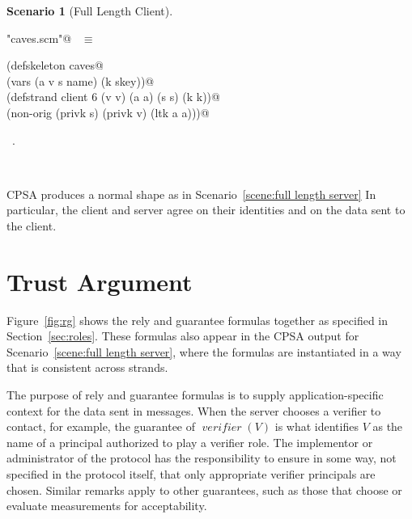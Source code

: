 \documentclass[titlepage,12pt]{article}
\theoremstyle{definition}
\newtheorem{scenario}{Scenario}
\DeclareMathOperator{\verifier}{\mathit{verifier}}
\begin{document}
\begin{scenario}[Full Length Client]\label{scene:full length client}
\begin{flushleft} \small
\begin{minipage}{\linewidth} \label{scrap32}
\verb@"caves.scm"@\nobreak\ {\footnotesize {} }$\equiv$
\vspace{-1ex}
\begin{list}{}{} \item
\mbox{}\verb@(defskeleton caves@\\
\mbox{}\verb@  (vars (a v s name) (k skey))@\\
\mbox{}\verb@  (defstrand client 6 (v v) (a a) (s s) (k k))@\\
\mbox{}\verb@  (non-orig (privk s) (privk v) (ltk a a)))@{\NWsep}
\end{list}
\vspace{-1ex}
\footnotesize\addtolength{\baselineskip}{-1ex}
\begin{list}{}{\setlength{\itemsep}{-\parsep}\setlength{\itemindent}{-\leftmargin}}
\item \NWtxtFileDefBy\ .
\end{list}
\end{minipage}\\[4ex]
\end{flushleft}
\end{scenario}

CPSA produces a normal shape as in Scenario~\ref{scene:full length server}
In particular, the client and server agree on their identities and on
the data sent to the client.

\section{Trust Argument}\label{sec:trust argument}

Figure~\ref{fig:rg} shows the rely and guarantee formulas together as
specified in Section~\ref{sec:roles}. These formulas also appear in
the CPSA output for Scenario~\ref{scene:full length server}, where the
formulas are instantiated in a way that is consistent across strands.

The purpose of rely and guarantee formulas is to supply
application-specific context for the data sent in messages.  When the
server chooses a verifier to contact, for example, the guarantee of
$\verifier(V)$ is what identifies $V$ as the name of a principal
authorized to play a verifier role. The implementor or administrator
of the protocol has the responsibility to ensure in some way, not
specified in the protocol itself, that only appropriate verifier
principals are chosen. Similar remarks apply to other guarantees, such
as those that choose or evaluate measurements for acceptability.
\end{document}
